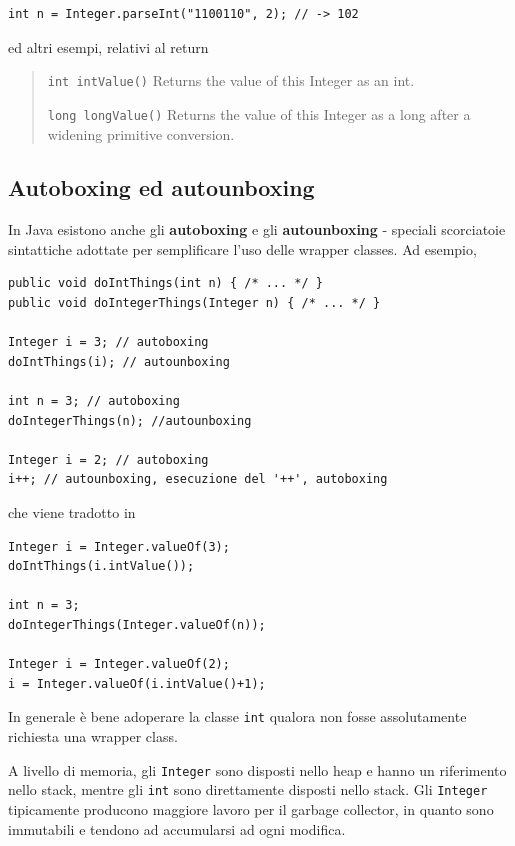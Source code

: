 \documentclass[\fontsizeclass,twocolumn]{\classname}
\theoremstyle{definition}
\theoremstyle{definition}
\begin{document}
\begin{lstlisting}
int n = Integer.parseInt("1100110", 2); // -> 102
\end{lstlisting}

ed altri esempi, relativi al return

\begin{quote}
    \footnotesize{\texttt{int intValue()} Returns the value of this Integer as an int.

        \texttt{long longValue()} Returns the value of this Integer as a long
after a widening primitive conversion.}
\end{quote}

\subsection{Autoboxing ed autounboxing}

In Java esistono anche gli \textbf{autoboxing} e gli \textbf{autounboxing} \--
speciali scorciatoie sintattiche adottate per semplificare l'uso delle wrapper
classes. Ad esempio,

\begin{lstlisting}
public void doIntThings(int n) { /* ... */ }
public void doIntegerThings(Integer n) { /* ... */ }

Integer i = 3; // autoboxing
doIntThings(i); // autounboxing

int n = 3; // autoboxing
doIntegerThings(n); //autounboxing

Integer i = 2; // autoboxing
i++; // autounboxing, esecuzione del '++', autoboxing
\end{lstlisting}

che viene tradotto in

\begin{lstlisting}
Integer i = Integer.valueOf(3);
doIntThings(i.intValue());

int n = 3;
doIntegerThings(Integer.valueOf(n));

Integer i = Integer.valueOf(2);
i = Integer.valueOf(i.intValue()+1);
\end{lstlisting}

In generale è bene adoperare la classe \texttt{int} qualora non fosse
assolutamente richiesta una wrapper class.

A livello di memoria, gli \texttt{Integer} sono disposti nello heap e hanno un
riferimento nello stack, mentre gli \texttt{int} sono direttamente disposti
nello stack. Gli \texttt{Integer} tipicamente producono maggiore lavoro per il
garbage collector, in quanto sono immutabili e tendono ad accumularsi ad ogni
modifica.
\end{document}
